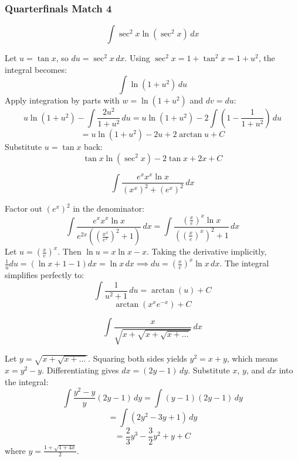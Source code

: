 \subsubsection*{Quarterfinals Match 4}
\begin{questions}
    \question
    \[ \int \sec^2 x \ln(\sec^2 x) \, dx \]
    \begin{solution}
        Let $u = \tan x$, so $du = \sec^2 x \, dx$. Using $\sec^2 x = 1 + \tan^2 x = 1 + u^2$, the integral becomes:
        \[ \int \ln(1 + u^2) \, du \]
        Apply integration by parts with $w = \ln(1+u^2)$ and $dv = du$:
        \[ u \ln(1+u^2) - \int \frac{2u^2}{1+u^2} \, du = u \ln(1+u^2) - 2\int \left(1 - \frac{1}{1+u^2}\right) \, du \]
        \[ = u \ln(1+u^2) - 2u + 2\arctan u + C \]
        Substitute $u = \tan x$ back:
        \[ \tan x \ln(\sec^2 x) - 2\tan x + 2x + C \]
    \end{solution}

    \question
    \[ \int \frac{e^x x^x \ln x}{(x^x)^2 + (e^x)^2} \, dx \]
    \begin{solution}
        Factor out $(e^x)^2$ in the denominator:
        \[ \int \frac{e^x x^x \ln x}{e^{2x} \left( \left(\frac{x^x}{e^x}\right)^2 + 1 \right)} \, dx = \int \frac{\left(\frac{x}{e}\right)^x \ln x}{\left(\left(\frac{x}{e}\right)^x\right)^2 + 1} \, dx \]
        Let $u = \left(\frac{x}{e}\right)^x$. Then $\ln u = x \ln x - x$. 
        Taking the derivative implicitly, $\frac{1}{u} du = (\ln x + 1 - 1) dx = \ln x \, dx \implies du = \left(\frac{x}{e}\right)^x \ln x \, dx$.
        The integral simplifies perfectly to:
        \[ \int \frac{1}{u^2 + 1} \, du = \arctan(u) + C \]
        \[ \arctan(x^x e^{-x}) + C \]
    \end{solution}

    \question
    \[ \int \frac{x}{\sqrt{x + \sqrt{x + \sqrt{x + \dots}}}} \, dx \]
    \begin{solution}
        Let $y = \sqrt{x + \sqrt{x + \dots}}$. Squaring both sides yields $y^2 = x + y$, which means $x = y^2 - y$. 
        Differentiating gives $dx = (2y - 1) \, dy$.
        Substitute $x$, $y$, and $dx$ into the integral:
        \[ \int \frac{y^2 - y}{y} (2y - 1) \, dy = \int (y - 1)(2y - 1) \, dy \]
        \[ = \int (2y^2 - 3y + 1) \, dy \]
        \[ = \frac{2}{3}y^3 - \frac{3}{2}y^2 + y + C \]
        where $y = \frac{1 + \sqrt{1 + 4x}}{2}$.
    \end{solution}
\end{questions}

